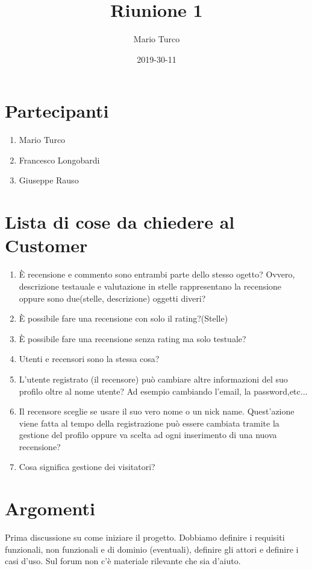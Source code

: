 \documentclass{article}
\title{Riunione 1}
\date{2019-30-11}
\author{Mario Turco}
\begin{document}
\maketitle
{}
\newpage
{}
\section{Partecipanti}
\begin{enumerate}
    \item Mario Turco
    \item Francesco Longobardi  
    \item Giuseppe Rauso
\end{enumerate}
\section{Lista di cose da chiedere al Customer}
\begin{enumerate}
    \item È recensione e commento sono entrambi parte dello stesso ogetto? Ovvero, descrizione testauale e valutazione in stelle rappresentano la recensione oppure sono due(stelle, descrizione) oggetti diveri?
    \item È possibile fare una recensione con solo il rating?(Stelle)
    \item È possibile fare una recensione senza rating ma solo testuale?
    \item Utenti e recensori sono la stessa cosa?
    \item L'utente registrato (il recensore) può cambiare altre informazioni del suo profilo oltre al nome utente? Ad esempio cambiando l'email, la password,etc...
    \item Il recensore sceglie se usare il suo vero nome o un nick name. Quest'azione viene fatta al tempo della registrazione può essere cambiata tramite la gestione del profilo oppure va scelta ad ogni inserimento di una nuova recensione?
    \item Cosa significa gestione dei visitatori?
\end{enumerate}
\newpage
\section{Argomenti}
Prima discussione su come iniziare il progetto.
Dobbiamo definire i requisiti funzionali, non funzionali e di dominio (eventuali), definire gli attori e definire i casi d'uso.
Sul forum non c'è materiale rilevante che sia d'aiuto.
\end{document}
